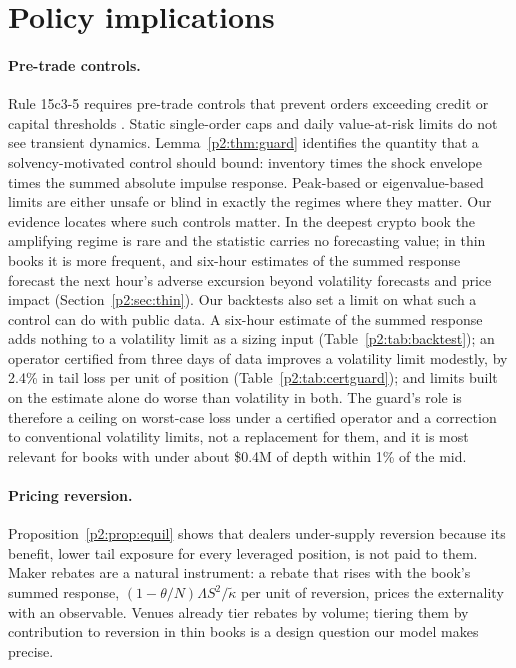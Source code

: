 \section{Policy implications}\label{p2:sec:policy}

\paragraph{Pre-trade controls.} Rule 15c3-5 requires pre-trade controls that prevent orders exceeding credit or capital thresholds \citep{p2:sec2010}. Static single-order caps and daily value-at-risk limits do not see transient dynamics. Lemma~\ref{p2:thm:guard} identifies the quantity that a solvency-motivated control should bound: inventory times the shock envelope times the summed absolute impulse response. Peak-based or eigenvalue-based limits are either unsafe or blind in exactly the regimes where they matter. Our evidence locates where such controls matter. In the deepest crypto book the amplifying regime is rare and the statistic carries no forecasting value; in thin books it is more frequent, and six-hour estimates of the summed response forecast the next hour's adverse excursion beyond volatility forecasts and price impact (Section~\ref{p2:sec:thin}). Our backtests also set a limit on what such a control can do with public data. A six-hour estimate of the summed response adds nothing to a volatility limit as a sizing input (Table~\ref{p2:tab:backtest}); an operator certified from three days of data improves a volatility limit modestly, by 2.4\% in tail loss per unit of position (Table~\ref{p2:tab:certguard}); and limits built on the estimate alone do worse than volatility in both. The guard's role is therefore a ceiling on worst-case loss under a certified operator and a correction to conventional volatility limits, not a replacement for them, and it is most relevant for books with under about \$0.4M of depth within 1\% of the mid.

\paragraph{Pricing reversion.} Proposition~\ref{p2:prop:equil} shows that dealers under-supply reversion because its benefit, lower tail exposure for every leveraged position, is not paid to them. Maker rebates are a natural instrument: a rebate that rises with the book's summed response, $(1-\theta/N)\Lambda S^2/\tilde\kappa$ per unit of reversion, prices the externality with an observable. Venues already tier rebates by volume; tiering them by contribution to reversion in thin books is a design question our model makes precise.

